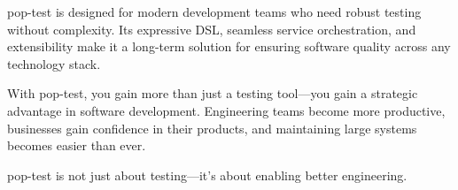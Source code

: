 \documentclass[11pt]{article}
\begin{document}
pop-test is designed for modern development teams who need robust testing without complexity. Its expressive DSL, seamless service orchestration, and extensibility make it a long-term solution for ensuring software quality across any technology stack.

With pop-test, you gain more than just a testing tool—you gain a strategic advantage in software development. Engineering teams become more productive, businesses gain confidence in their products, and maintaining large systems becomes easier than ever.

pop-test is not just about testing—it’s about enabling better engineering.
\end{document}
